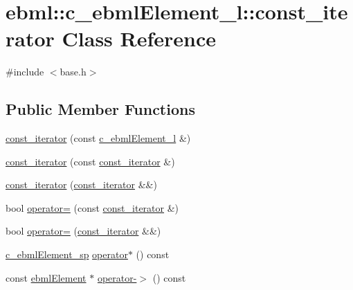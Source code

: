 \hypertarget{classebml_1_1c__ebmlElement__l_1_1const__iterator}{}\section{ebml\+:\+:c\+\_\+ebml\+Element\+\_\+l\+:\+:const\+\_\+iterator Class Reference}
\label{classebml_1_1c__ebmlElement__l_1_1const__iterator}


{\ttfamily \#include $<$base.\+h$>$}

\subsection*{Public Member Functions}
\begin{DoxyCompactItemize}
\item 
\mbox{\hyperlink{classebml_1_1c__ebmlElement__l_1_1const__iterator_af60f14288ea94411dac565178511fad8}{const\+\_\+iterator}} (const \mbox{\hyperlink{classebml_1_1c__ebmlElement__l}{c\+\_\+ebml\+Element\+\_\+l}} \&)
\item 
\mbox{\hyperlink{classebml_1_1c__ebmlElement__l_1_1const__iterator_a619451ba353d2edeaf3db47795a94137}{const\+\_\+iterator}} (const \mbox{\hyperlink{classebml_1_1c__ebmlElement__l_1_1const__iterator}{const\+\_\+iterator}} \&)
\item 
\mbox{\hyperlink{classebml_1_1c__ebmlElement__l_1_1const__iterator_a65c7fd56f4d0e06a87c82a999ce6c6de}{const\+\_\+iterator}} (\mbox{\hyperlink{classebml_1_1c__ebmlElement__l_1_1const__iterator}{const\+\_\+iterator}} \&\&)
\item 
bool \mbox{\hyperlink{classebml_1_1c__ebmlElement__l_1_1const__iterator_aa9af73ac6e58f68b0c3a2042de9d171a}{operator=}} (const \mbox{\hyperlink{classebml_1_1c__ebmlElement__l_1_1const__iterator}{const\+\_\+iterator}} \&)
\item 
bool \mbox{\hyperlink{classebml_1_1c__ebmlElement__l_1_1const__iterator_a5e4cdbf23a95d534e49ed3ce86ce24bf}{operator=}} (\mbox{\hyperlink{classebml_1_1c__ebmlElement__l_1_1const__iterator}{const\+\_\+iterator}} \&\&)
\item 
\mbox{\hyperlink{namespaceebml_a2deef4e8071531b32e3533f1bf978917}{c\+\_\+ebml\+Element\+\_\+sp}} \mbox{\hyperlink{classebml_1_1c__ebmlElement__l_1_1const__iterator_a4992293979f6177882f612ad01879465}{operator$\ast$}} () const
\item 
const \mbox{\hyperlink{classebml_1_1ebmlElement}{ebml\+Element}} $\ast$ \mbox{\hyperlink{classebml_1_1c__ebmlElement__l_1_1const__iterator_a8e9cc0f60248685efff94c6fe0c33be1}{operator-\/$>$}} () const

\end{DoxyCompactItemize}
